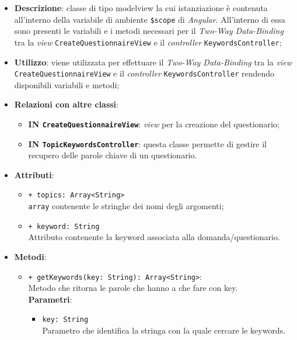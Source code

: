 				\begin{itemize}
					\item \textbf{Descrizione}: classe di tipo modelview la cui istanziazione è contenuta all'interno della variabile di ambiente \texttt{\$scope} di \textit{Angular}. All'interno di essa sono presenti le variabili e i metodi necessari per il \textit{Two-Way Data-Binding\ped{G}} tra la \textit{view} \texttt{CreateQuestionnaireView} e il \textit{controller} \texttt{KeywordsController};
					\item \textbf{Utilizzo}: viene utilizzata per effettuare il \textit{Two-Way Data-Binding\ped{G}} tra la \textit{view}\\ \texttt{CreateQuestionnaireView} e il \textit{controller} \texttt{KeywordsController} rendendo disponibili variabili e metodi;
					\item \textbf{Relazioni con altre classi}: 
					\begin{itemize}
						\item \textbf{IN \texttt{CreateQuestionnaireView}}: \textit{view} per la creazione del questionario; 
						\item \textbf{IN \texttt{TopicKeywordsController}}: questa classe permette di gestire il recupero delle parole chiave di un questionario.
					\end{itemize}
					\item \textbf{Attributi}: 
					\begin{itemize}
						\item \texttt{+ topics: Array<String>} \\ \texttt{array} contenente le stringhe dei nomi degli argomenti;
						\item \texttt{+ keyword: String} \\ Attributo contenente la keyword associata alla domanda/questionario.
					\end{itemize}
					\item \textbf{Metodi}: 
					\begin{itemize}
						\item \texttt{+ getKeywords(key: String): Array<String>}: \\ Metodo che ritorna le parole che hanno a che fare con key.\\						
						\textbf{Parametri}:
						\begin{itemize}
							\item \texttt{key: String}\\
							Parametro che identifica la stringa con la quale cercare le keywords. 
						\end{itemize}
					\end{itemize}
				\end{itemize}
				
					